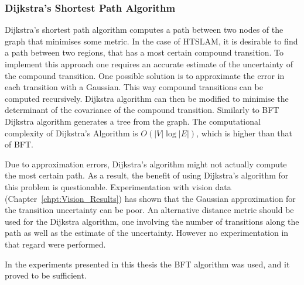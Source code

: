 \subsubsection{Dijkstra's Shortest Path Algorithm}


Dijkstra's shortest path algorithm computes a path between two nodes
of the graph that minimises some metric. In the case of HTSLAM, it is
desirable to find a path between two regions, that has a most certain
compound transition. To implement this approach one requires an
accurate estimate of the uncertainty of the compound transition.  One
possible solution is to approximate the error in each transition with
a Gaussian. This way compound transitions can be computed
recursively. Dijkstra algorithm can then be modified to minimise the
determinant of the covariance of the compound transition. Similarly to
BFT Dijkstra algorithm generates a tree from the graph. The
computational complexity of Dijkstra's Algorithm is $O(|V| \log |E|)$,
which is higher than that of BFT.

Due to approximation errors, Dijkstra's algorithm might not actually
compute the most certain path. As a result, the benefit of using
Dijkstra's algorithm for this problem is questionable. Experimentation
with vision data (Chapter~\ref{chpt:Vision_Results}) has shown that
the Gaussian approximation for the transition uncertainty can be poor.
An alternative distance metric should be used for the Dijkstra
algorithm, one involving the number of transitions along the path as well
as the estimate of the uncertainty. However no experimentation in that
regard were performed.

In the experiments presented in this thesis the BFT algorithm was
used, and it proved to be sufficient.




